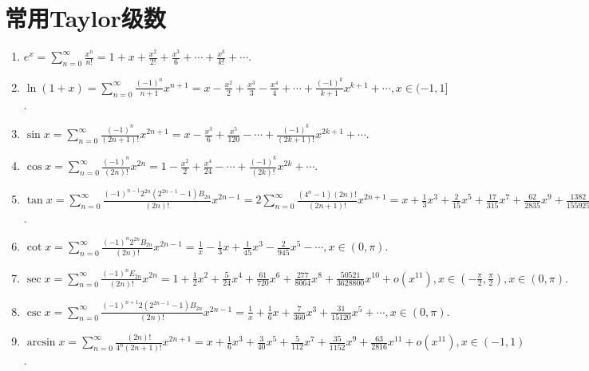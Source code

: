 \documentclass[../../main.tex]{subfiles}
\begin{document}
\section{常用Taylor级数}

\begin{enumerate}
\item $e^x=\sum_{n=0}^{\infty}\frac{x^n}{n!}=1+x+\frac{x^2}{2!}+\frac{x^3}{6}+\cdots+\frac{x^k}{k!}+\cdots$.
\\
\item $\ln(1+x)=\sum_{n=0}^{\infty}\frac{(-1)^n}{n+1}x^{n+1}=x-\frac{x^2}{2}+\frac{x^3}{3}-\frac{x^4}{4}+\cdots+\frac{(-1)^k}{k+1}x^{k+1}+\cdots,x\in(-1,1]$.
\\
\item $\sin x=\sum_{n=0}^{\infty}\frac{(-1)^n}{(2n+1)!}x^{2n+1}=x-\frac{x^3}{6}+\frac{x^5}{120}-\cdots+\frac{(-1)^k}{(2k+1)!}x^{2k+1}+\cdots$.
\\
\item $\cos x=\sum_{n=0}^{\infty}\frac{(-1)^n}{(2n)!}x^{2n}=1-\frac{x^2}{2}+\frac{x^4}{24}-\cdots+\frac{(-1)^k}{(2k)!}x^{2k}+\cdots$.
\\
\item $\tan x=\sum_{n=0}^{\infty}{\frac{\left( -1 \right) ^{n-1}2^{2n}\left( 2^{2n-1}-1 \right) B_{2n}}{\left( 2n \right) !}x^{2n-1}}
=2\sum_{n=0}^{\infty}\frac{(4^n-1)(2n)!}{(2n+1)!}x^{2n+1}
=x+\frac{1}{3}x^3+\frac{2}{15}x^5+\frac{17}{315}x^7+\frac{62}{2835}x^9+\frac{1382}{155925}x^{11}+o(x^{11}),x\in\left(-\frac{\pi}{2},\frac{\pi}{2}\right)$.
\\
\item $\cot x=\sum_{n=0}^{\infty}{\frac{\left( -1 \right) ^n2^{2n}B_{2n}}{\left( 2n \right) !}x^{2n-1}}=\frac{1}{x}-\frac{1}{3}x+\frac{1}{45}x^3-\frac{2}{945}x^5-\cdots ,x\in \left( 0,\pi \right) .$
\\
\item $\sec x=\sum_{n=0}^{\infty}\frac{(-1)^nE_{2n}}{(2n)!}x^{2n}=1+\frac{1}{2}x^2+\frac{5}{24}x^4+\frac{61}{720}x^6+\frac{277}{8064}x^8+\frac{50521}{3628800}x^{10}+o(x^{11}),x\in\left(-\frac{\pi}{2},\frac{\pi}{2}\right),x\in (0,\pi).$
\\
\item $\csc x=\sum_{n=0}^{\infty}{\frac{\left( -1 \right) ^{n+1}2\left( 2^{2n-1}-1 \right) B_{2n}}{\left( 2n \right) !}x^{2n-1}}=\frac{1}{x}+\frac{1}{6}x+\frac{7}{360}x^3+\frac{31}{15120}x^5+\cdots ,x\in \left( 0,\pi \right) .$
\\
\item $\arcsin x=\sum_{n=0}^{\infty}\frac{(2n)!}{4^n(2n+1)!}x^{2n+1}=x+\frac{1}{6}x^3+\frac{3}{40}x^5+\frac{5}{112}x^7+\frac{35}{1152}x^9+\frac{63}{2816}x^{11}+o(x^{11}),x\in(-1,1)$.

\end{enumerate}
\end{document}
